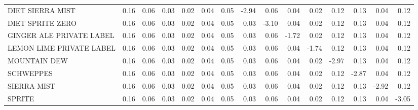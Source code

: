 \begin{tabular}{lrrrrrrrrrrrrrr}
DIET SIERRA MIST              &        0.16 &             0.06 &                           0.03 &                           0.02 &               0.04 &            0.05 &             -2.94 &              0.06 &                      0.04 &                      0.02 &          0.12 &       0.13 &         0.04 &    0.12 \\
DIET SPRITE ZERO              &        0.16 &             0.06 &                           0.03 &                           0.02 &               0.04 &            0.05 &              0.03 &             -3.10 &                      0.04 &                      0.02 &          0.12 &       0.13 &         0.04 &    0.12 \\
GINGER ALE PRIVATE LABEL      &        0.16 &             0.06 &                           0.03 &                           0.02 &               0.04 &            0.05 &              0.03 &              0.06 &                     -1.72 &                      0.02 &          0.12 &       0.13 &         0.04 &    0.12 \\
LEMON LIME PRIVATE LABEL      &        0.16 &             0.06 &                           0.03 &                           0.02 &               0.04 &            0.05 &              0.03 &              0.06 &                      0.04 &                     -1.74 &          0.12 &       0.13 &         0.04 &    0.12 \\
MOUNTAIN DEW                  &        0.16 &             0.06 &                           0.03 &                           0.02 &               0.04 &            0.05 &              0.03 &              0.06 &                      0.04 &                      0.02 &         -2.97 &       0.13 &         0.04 &    0.12 \\
SCHWEPPES                     &        0.16 &             0.06 &                           0.03 &                           0.02 &               0.04 &            0.05 &              0.03 &              0.06 &                      0.04 &                      0.02 &          0.12 &      -2.87 &         0.04 &    0.12 \\
SIERRA MIST                   &        0.16 &             0.06 &                           0.03 &                           0.02 &               0.04 &            0.05 &              0.03 &              0.06 &                      0.04 &                      0.02 &          0.12 &       0.13 &        -2.92 &    0.12 \\
SPRITE                        &        0.16 &             0.06 &                           0.03 &                           0.02 &               0.04 &            0.05 &              0.03 &              0.06 &                      0.04 &                      0.02 &          0.12 &       0.13 &         0.04 &   -3.05 \\
\bottomrule
\end{tabular}
